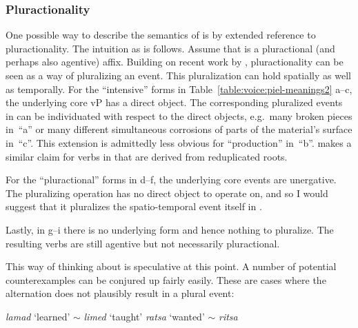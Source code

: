 \begin{exe}
\begin{xlist}
\begin{exe}
\begin{xlist}
\begin{exe}
\begin{xlist}
\begin{exe}
\begin{exe}
\begin{xlist}
\begin{exe}
\begin{xlist}
\begin{exe}
\begin{xlist}
\begin{exe}
\begin{xlist}
\begin{exe}
\begin{xlist}
\begin{exe}
\begin{xlist}
\begin{exe}
\begin{xlist}
\begin{exe}
\begin{xlist}
\begin{xlist}
\begin{exe}
\begin{xlist}
\begin{exe}
\begin{xlist}
\begin{exe}
\begin{xlist}
\begin{exe}
\begin{xlist}
\begin{exe}
\begin{xlist}
\begin{exe}
\begin{xlist}
\begin{exe}
\begin{xlist}
\begin{exe}
\begin{xlist}
\begin{exe}
\begin{xlist}
\begin{exe}
\begin{xlist}
\begin{exe}
\begin{xlist}
\begin{exe}
\begin{xlist}
\begin{xlist}
\begin{xlist}
\begin{exe}
\begin{xlist}
\begin{xlist}
\begin{xlist}
\begin{exe}
\begin{exe}
\begin{xlist}
\begin{exe}
\begin{xlist}
\begin{exe}
\begin{xlist}
\begin{exe}
\begin{xlist}
\begin{exe}
\begin{xlist}
\begin{exe}
\begin{xlist}
\begin{exe}
\begin{xlist}
\begin{exe}
\begin{exe}
\begin{xlist}
\begin{xlist}
\begin{exe}
\begin{xlist}
\begin{exe}
\begin{xlist}
\begin{exe}
\begin{xlist}
\begin{exe}
\begin{xlist}
\begin{exe}
\begin{xlist}
\begin{exe}
\begin{xlist}
\begin{exe}
\begin{exe}
\begin{exe}
\begin{xlist}
\begin{exe}
\begin{xlist}
\begin{exe}
\begin{xlist}
		\subsubsection{Pluractionality} \label{voice:va:sem:plural}
One possible way to describe the semantics of {\va} is by extended reference to pluractionality. The intuition as is follows. Assume that {\va} is a pluractional (and perhaps also agentive) affix. Building on recent work by \cite{henderson12phd,henderson17nllt}, pluractionality can be seen as a way of pluralizing an event. This pluralization can hold spatially as well as temporally. For the ``intensive'' forms in Table~\ref{table:voice:piel-meanings2} a--c, the underlying core vP has a direct object. The corresponding pluralized events in {\tpie} can be individuated with respect to the direct objects, e.g.~many broken pieces in~``a'' or many different simultaneous corrosions of parts of the material's surface in~``c''. This extension is admittedly less obvious for ``production'' in~``b''. \cite{greenberg10} makes a similar claim for verbs in {\tpie} that are derived from reduplicated roots.

For the ``pluractional'' forms in d--f, the underlying core events are unergative. The pluralizing operation has no direct object to operate on, and so I would suggest that it pluralizes the spatio-temporal event itself in {\tpie}.

Lastly, in g--i there is no underlying form and hence nothing to pluralize. The resulting verbs are still agentive but not necessarily pluractional.

This way of thinking about {\tpie} is speculative at this point. A number of potential counterexamples can be conjured up fairly easily. These are cases where the alternation does not plausibly result in a plural event:
 \begin{exe}
 \ex  \label{ex:2n62}
 \begin{xlist} 
 	\ex  \emph{lamad} `learned' $\sim$ \emph{limed} `taught' 
 	\ex   \emph{ratsa} `wanted' $\sim$ \emph{ritsa} 
\end{xlist}
\end{exe}
\end{xlist}
\end{exe}
\end{xlist}
\end{exe}
\end{xlist}
\end{exe}
\end{exe}
\end{exe}
\end{xlist}
\end{exe}
\end{xlist}
\end{exe}
\end{xlist}
\end{exe}
\end{xlist}
\end{exe}
\end{xlist}
\end{exe}
\end{xlist}
\end{exe}
\end{xlist}
\end{xlist}
\end{exe}
\end{exe}
\end{xlist}
\end{exe}
\end{xlist}
\end{exe}
\end{xlist}
\end{exe}
\end{xlist}
\end{exe}
\end{xlist}
\end{exe}
\end{xlist}
\end{exe}
\end{xlist}
\end{exe}
\end{exe}
\end{xlist}
\end{xlist}
\end{xlist}
\end{exe}
\end{xlist}
\end{xlist}
\end{xlist}
\end{exe}
\end{xlist}
\end{exe}
\end{xlist}
\end{exe}
\end{xlist}
\end{exe}
\end{xlist}
\end{exe}
\end{xlist}
\end{exe}
\end{xlist}
\end{exe}
\end{xlist}
\end{exe}
\end{xlist}
\end{exe}
\end{xlist}
\end{exe}
\end{xlist}
\end{exe}
\end{xlist}
\end{exe}
\end{xlist}
\end{xlist}
\end{exe}
\end{xlist}
\end{exe}
\end{xlist}
\end{exe}
\end{xlist}
\end{exe}
\end{xlist}
\end{exe}
\end{xlist}
\end{exe}
\end{xlist}
\end{exe}
\end{xlist}
\end{exe}
\end{exe}
\end{xlist}
\end{exe}
\end{xlist}
\end{exe}
\end{xlist}
\end{exe}
